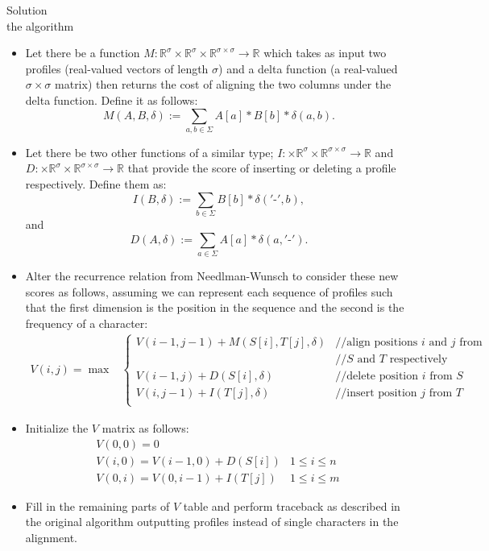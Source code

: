 \documentclass[11pt, oneside]{article}   	%
\begin{document}
\begin{enumerate}
{\huge Solution}\\
{\Large the algorithm}
\begin{itemize}
\item Let there be a function $M:\mathbb{R}^\sigma\times\mathbb{R}^\sigma\times\mathbb{R}^{\sigma\times\sigma}\rightarrow\mathbb{R}$ 
which takes as input two profiles (real-valued vectors of length $\sigma$) 
and a delta function (a real-valued $\sigma\times\sigma$ matrix) 
then returns the cost of aligning the two columns under the delta function. 
 Define it as follows:
 \[
 	M(A,B,\delta) := \sum_{a,b\in\Sigma} A[a]*B[b]*\delta(a,b).
 \]
 \item Let there be two other functions of a similar type; 
 $I:\times\mathbb{R}^\sigma\times\mathbb{R}^{\sigma\times\sigma}\rightarrow\mathbb{R}$ and 
 $D:\times\mathbb{R}^\sigma\times\mathbb{R}^{\sigma\times\sigma}\rightarrow\mathbb{R}$ that provide the score of inserting or deleting a profile respectively. 
 Define them as: 
  \[
 	I(B,\delta) := \sum_{b\in\Sigma} B[b]*\delta('\texttt{-}',b),
 \] 
 and
  \[
 	D(A,\delta) := \sum_{a\in\Sigma} A[a]*\delta(a,'\texttt{-}').
 \]
 \item Alter the recurrence relation from Needlman-Wunsch to consider these new scores as follows, 
 assuming we can represent each sequence of profiles such that the first dimension is the position in the sequence and the second is the frequency of a character:
 \[
 \begin{array}{rl}
 V(i,j) = \max &
 
 \begin{cases}
V(i-1,j-1) + M(S[i],T[j],\delta) & // \text{align positions $i$ and $j$ from } \\
					   & // \text{$S$ and $T$ respectively} \\
V(i-1,j) + D(S[i],\delta)	   & // \text{delete position $i$ from $S$}\\
V(i,j-1) + I(T[j],\delta)	   & // \text{insert position $j$ from $T$}\\
 \end{cases}
 \end{array}
 \]
 \item Initialize the $V$ matrix as follows:
 \[
 	\begin{array}{ll}
	V(0,0) = 0 & \\
	V(i,0) = V(i-1,0) + D(S[i]) & 1 \le i \le n\\
	V(0,i) = V(0,i-1) + I(T[j]) & 1 \le i \le m\
	\end{array}
 \]
 \item Fill in the remaining parts of $V$ table and perform traceback as described in the original algorithm outputting profiles instead of single characters in the alignment. 
\end{itemize}
\end{enumerate}
\end{document}

